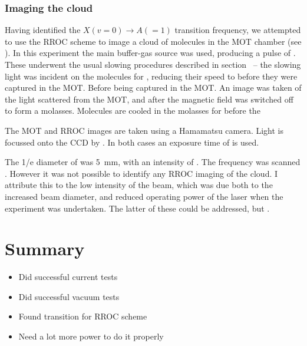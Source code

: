 \begin{figure}
  \centering
  \caption{}
  \label{exper:fig:beamresult}
\end{figure}

\subsubsection{Imaging the \CaF{} cloud}

Having identified the $X(v=0)\rightarrow A(=1)$ transition frequency, we
attempted to use the RROC scheme to image a cloud of \CaF{} molecules in the
MOT chamber (see ). In this experiment the main \CaF{}
buffer-gas source was used, producing a pulse of . These
underwent the usual slowing procedures described in section~ -- the slowing light was incident on the molecules for
, reducing their speed to  before they were captured in the
MOT. Before being captured in the MOT. An image was taken of the light
scattered from the MOT, and after the magnetic field was switched off
to form a molasses. Molecules are cooled in the molasses for  before
the 

The MOT and RROC images are taken using a Hamamatsu  camera. Light is
focussed onto the CCD by . In both cases
an exposure time of  is used.


\begin{figure}
  \centering
  \caption{}
  \label{exper:fig:laser}
\end{figure}


The 1/e diameter of  was \SI{5}{\milli\meter}, with an intensity
of . The frequency was scanned . However
it was not possible to identify any RROC imaging of the cloud. I attribute this
to the low intensity of the  beam, which was due both to the
increased beam diameter, and reduced operating power of the laser when the
experiment was undertaken. The latter of these could be addressed, but .

\section{Summary}

\begin{itemize}
    \item Did successful current tests
    \item Did successful vacuum tests
    \item Found transition for RROC scheme
    \item Need a lot more power to do it properly
\end{itemize}

